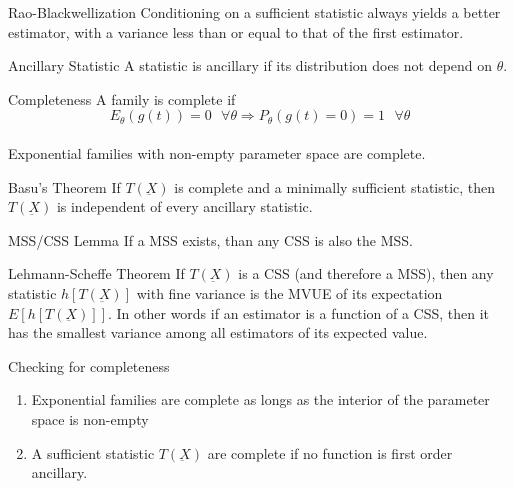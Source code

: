 \documentclass[avery5388,grid,frame]{flashcards}
\begin{document}
\begin{flashcard}[Definition]{Rao-Blackwellization}
\bigskip\bigskip\bigskip
Conditioning on a sufficient statistic always yields a better estimator, with a variance less than or equal to that of the first estimator.
\end{flashcard}
\begin{flashcard}[Definition]{Ancillary Statistic}
\bigskip\bigskip\bigskip
A statistic is ancillary if its distribution does not depend on $\theta$. 
\end{flashcard}
\begin{flashcard}[Definition]{Completeness}
\bigskip\bigskip\bigskip
A family is complete if
\begin{equation*}
E_\theta(g(t))=0\textrm{     }\forall\theta\Rightarrow P_\theta(g(t)=0)=1\textrm{   }\forall\theta
\end{equation*}
\bigskip\\
Exponential families with non-empty parameter space are complete.
\end{flashcard}
\begin{flashcard}[Definition]{Basu's Theorem}
\bigskip\bigskip\bigskip
If $T(\underbar{X})$ is complete and a minimally sufficient statistic, then $T(\underbar{X})$ is independent of every ancillary statistic.
\end{flashcard}
\begin{flashcard}[Definition]{MSS/CSS Lemma}
\bigskip\bigskip\bigskip
If a MSS exists, than any CSS is also the MSS.
\end{flashcard}
\begin{flashcard}[Definition]{Lehmann-Scheffe Theorem}
\bigskip\bigskip\bigskip
If $T(\underbar{X})$ is a CSS (and therefore a MSS), then any statistic $h[T(\underbar{X})]$ with fine variance is the MVUE of its expectation $E[h[T(\underbar{X})]]$. In other words if an estimator is a function of a CSS, then it has the smallest variance among all estimators of its expected value.
\end{flashcard}
\begin{flashcard}[Definition]{Checking for completeness}
\bigskip\bigskip\bigskip
\begin{enumerate}
\item Exponential families are complete as longs as the interior of the parameter space is non-empty
\item A sufficient statistic $T(\underbar{X})$ are complete if no function is first order ancillary.
\end{enumerate}
\end{flashcard}
\end{document}
